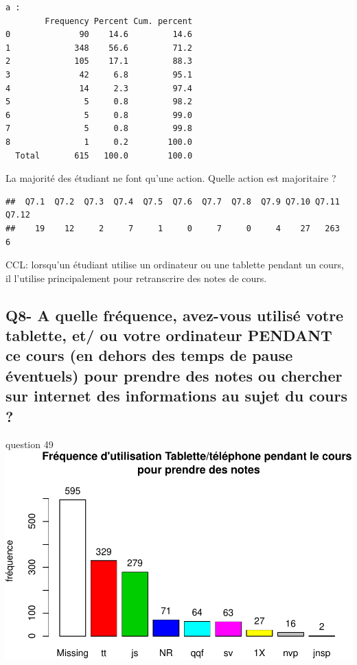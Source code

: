 \documentclass[]{article}
\begin{document}
\begin{verbatim}
a : 
        Frequency Percent Cum. percent
0              90    14.6         14.6
1             348    56.6         71.2
2             105    17.1         88.3
3              42     6.8         95.1
4              14     2.3         97.4
5               5     0.8         98.2
6               5     0.8         99.0
7               5     0.8         99.8
8               1     0.2        100.0
  Total       615   100.0        100.0
\end{verbatim}

La majorité des étudiant ne font qu'une action. Quelle action est
majoritaire ?

\begin{verbatim}
##  Q7.1  Q7.2  Q7.3  Q7.4  Q7.5  Q7.6  Q7.7  Q7.8  Q7.9 Q7.10 Q7.11 Q7.12 
##    19    12     2     7     1     0     7     0     4    27   263     6
\end{verbatim}

CCL: lorsqu'un étudiant utilise un ordinateur ou une tablette pendant un
cours, il l'utilise principalement pour retranscrire des notes de cours.

\subsection{Q8- A quelle fréquence, avez-vous utilisé votre tablette,
et/ ou votre ordinateur PENDANT ce cours (en dehors des temps de pause
éventuels) pour prendre des notes ou chercher sur internet des
informations au sujet du cours
?}\label{q8--a-quelle-frequence-avez-vous-utilise-votre-tablette-et-ou-votre-ordinateur-pendant-ce-cours-en-dehors-des-temps-de-pause-eventuels-pour-prendre-des-notes-ou-chercher-sur-internet-des-informations-au-sujet-du-cours}

question 49
\includegraphics{qs_etudiants_files/figure-latex/utilisatin3-1.pdf}
\end{document}
